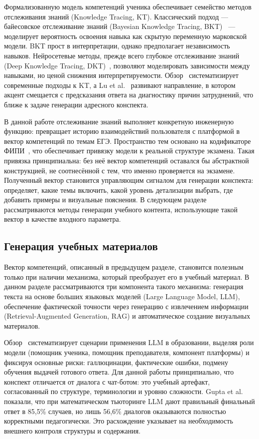 Формализованную модель компетенций ученика обеспечивает семейство методов отслеживания знаний (Knowledge Tracing, KT). Классический подход --- байесовское отслеживание знаний (Bayesian Knowledge Tracing, BKT)~\cite{CorbettAnderson1994} --- моделирует вероятность освоения навыка как скрытую переменную марковской модели. BKT прост в интерпретации, однако предполагает независимость навыков. Нейросетевые методы, прежде всего глубокое отслеживание знаний (Deep Knowledge Tracing, DKT)~\cite{Piech2015}, позволяют моделировать зависимости между навыками, но ценой снижения интерпретируемости. Обзор~\cite{KTSurvey2022} систематизирует современные подходы к KT, а Lu et al.~\cite{Lu2024AKT} развивают направление, в котором акцент смещается с предсказания ответа на диагностику причин затруднений, что ближе к задаче генерации адресного конспекта.

В данной работе отслеживание знаний выполняет конкретную инженерную функцию: превращает историю взаимодействий пользователя с платформой в вектор компетенций по темам ЕГЭ. Пространство тем основано на кодификаторе ФИПИ~\cite{FIPI2025Demo}, что обеспечивает привязку модели к реальной структуре экзамена. Такая привязка принципиальна: без неё вектор компетенций оставался бы абстрактной конструкцией, не соотнесённой с тем, что именно проверяется на экзамене. Полученный вектор становится управляющим сигналом для генерации конспекта: определяет, какие темы включить, какой уровень детализации выбрать, где добавить примеры и визуальные пояснения. В следующем разделе рассматриваются методы генерации учебного контента, использующие такой вектор в качестве входного параметра.


\subsection{Генерация учебных материалов}
\label{sec:generation}

Вектор компетенций, описанный в предыдущем разделе, становится полезным только при наличии механизма, который преобразует его в учебный материал. В данном разделе рассматриваются три компонента такого механизма: генерация текста на основе больших языковых моделей (Large Language Model, LLM), обеспечение фактической точности через генерацию с извлечением информации (Retrieval-Augmented Generation, RAG) и автоматическое создание визуальных материалов.

Обзор~\cite{LLM4EduSurvey2024} систематизирует сценарии применения LLM в образовании, выделяя роли модели (помощник ученика, помощник преподавателя, компонент платформы) и фиксируя основные риски: галлюцинации, фактические ошибки, подмену обучения выдачей готового ответа. Для данной работы принципиально, что конспект отличается от диалога с чат-ботом: это учебный артефакт, согласованный по структуре, терминологии и уровню сложности. Gupta et al.~\cite{Gupta2025BeyondFinal} показали, что при математическом тьюторинге LLM дают правильный финальный ответ в 85{,}5\% случаев, но лишь 56{,}6\% диалогов оказываются полностью корректными педагогически. Это расхождение указывает на необходимость внешнего контроля структуры и содержания.


